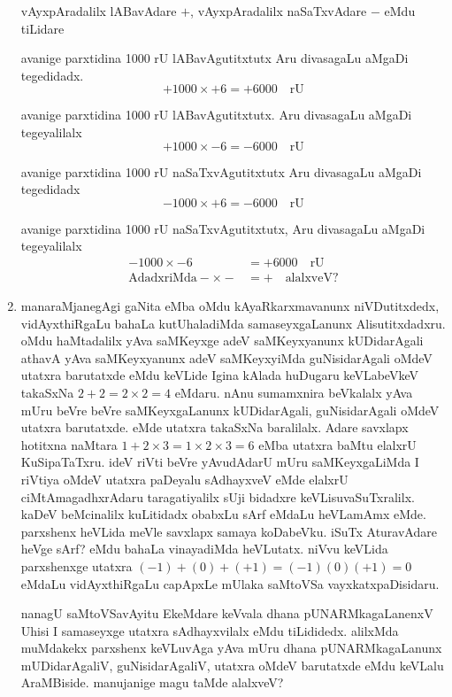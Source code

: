 \begin{enumerate}[\rm 1]
vAyxpAradalilx lABavAdare $+$, vAyxpAradalilx naSaTxvAdare $-$ eMdu tiLidare 

avanige parxtidina {\rm 1000} rU lABavAgutitxtutx Aru divasagaLu aMgaDi tegedidadx.
$$
+1000\times +6=+6000 \quad \text{rU}
$$

avanige parxtidina {\rm 1000} rU lABavAgutitxtutx. Aru divasagaLu aMgaDi tegeyalilalx
$$
+1000\times -6=-6000  \quad \text{rU}
$$

avanige parxtidina {\rm 1000} rU naSaTxvAgutitxtutx Aru divasagaLu aMgaDi tegedidadx 
$$
-1000\times +6=-6000  \quad \text{rU}
$$

avanige parxtidina {\rm 1000} rU naSaTxvAgutitxtutx, Aru divasagaLu aMgaDi tegeyalilalx
\begin{align*}
-1000\times -6&=+6000 \quad \text{rU}\\
\text{AdadxriMda} -\times -&=+ \quad \text{alalxveV?}
\end{align*}

\item manaraMjanegAgi gaNita eMba oMdu kAyaRkarxmavanunx niVDutitxdedx, vidAyxthiRgaLu bahaLa kutUhaladiMda samaseyxgaLanunx Alisutitxdadxru. oMdu haMtadalilx yAva saMKeyxge adeV saMKeyxyanunx kUDidarAgali athavA yAva saMKeyxyanunx adeV saMKeyxyiMda guNisidarAgali oMdeV utatxra barutatxde eMdu keVLide Igina kAlada huDugaru keVLabeVkeV takaSxNa $2+2=2\times 2=4$ eMdaru. nAnu sumamxnira beVkalalx yAva mUru beVre beVre saMKeyxgaLanunx kUDidarAgali, guNisidarAgali oMdeV utatxra barutatxde. eMde utatxra takaSxNa baralilalx. Adare savxlapx hotitxna naMtara $1+2\times 3=1\times 2\times 3=6$ eMba utatxra baMtu elalxrU KuSipaTaTxru. ideV riVti beVre yAvudAdarU mUru saMKeyxgaLiMda I riVtiya oMdeV utatxra paDeyalu sAdhayxveV eMde elalxrU ciMtAmagadhxrAdaru taragatiyalilx sUji bidadxre keVLisuvaSuTxralilx. kaDeV beMcinalilx kuLitidadx obabxLu sArf eMdaLu heVLamAmx eMde. parxshenx heVLida meVle savxlapx samaya koDabeVku. iSuTx AturavAdare heVge sArf? eMdu bahaLa vinayadiMda heVLutatx. niVvu keVLida parxshenxge utatxra $(-1)+(0)+(+1)=(-1)(0)(+1)=0$ eMdaLu vidAyxthiRgaLu capApxLe mUlaka saMtoVSa vayxkatxpaDisidaru. 

nanagU saMtoVSavAyitu EkeMdare keVvala dhana pUNARMkagaLanenxV Uhisi I samaseyxge utatxra sAdhayxvilalx eMdu tiLididedx. alilxMda muMdakekx parxshenx keVLuvAga yAva mUru dhana pUNARMkagaLanunx mUDidarAgaliV, guNisidarAgaliV, utatxra oMdeV barutatxde eMdu keVLalu AraMBiside. manujanige magu taMde alalxveV?
\end{enumerate}





